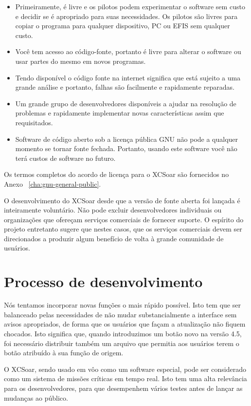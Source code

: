 \begin{itemize}
\item Primeiramente, é livre e os pilotos podem experimentar o software sem custo e decidir se é apropriado para suas necessidades.  Os pilotos são livres para copiar o programa para qualquer dispositivo, PC ou EFIS sem qualquer custo.
\item Você tem acesso ao código-fonte, portanto é livre para alterar o software ou usar partes do mesmo em novos programas.
\item Tendo disponível o código fonte na internet significa que está sujeito a uma grande análise e portanto, falhas são facilmente e rapidamente reparadas.
\item Um grande grupo de desenvolvedores disponíveis a ajudar na resolução de problemas e rapidamente implementar novas características assim que requisitados.
\item Software de código aberto sob a licença pública GNU não pode a qualquer momento se tornar fonte fechada.  Portanto, usando este software você não terá custos de software no futuro.
\end{itemize}

Os termos completos do acordo de licença para o XCSoar são fornecidos no Anexo ~\ref{cha:gnu-general-public}.

O desenvolvimento do XCSoar desde que a versão de fonte aberta foi lançada é inteiramente voluntário.  Não pode excluir desenvolvedores individuais ou organizações que ofereçam serviços comerciais de fornecer suporte.  O espírito do projeto entretanto sugere que nestes casos, que os serviços comerciais devem ser direcionados a produzir algum benefício de volta à grande comunidade de usuários.


\section{Processo de desenvolvimento}

Nós tentamos incorporar novas funções o mais rápido possível.  Isto tem que ser balanceado pelas necessidades de não mudar substancialmente a interface sem avisos apropriados, de forma que os usuários que façam a atualização não fiquem chocados.  Isto significa que, quando introduzimos um botão novo na versão 4.5, foi necessário distribuir também um arquivo que permitia aos usuários terem o botão atribuído à sua função de origem.

O XCSoar, sendo usado em vôo como um software especial, pode ser considerado como um sistema de missões críticas em tempo real.  Isto tem uma alta relevância para os desenvolvedores, para que desempenhem vários testes antes de lançar as mudanças ao público.

